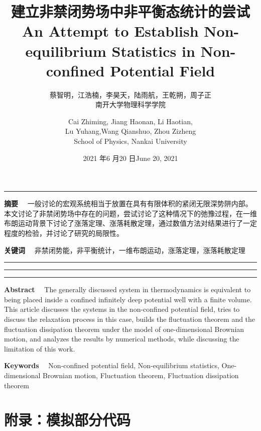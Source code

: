\documentclass[a4paper,12pt]{ctexart}
\title{建立非禁闭势场中非平衡态统计的尝试}
\author{蔡智明，江浩楠，李昊天，陆雨航，王乾朔，周子正\\南开大学物理科学学院}
\date{2021 年6 月20 日}
\begin{document}
    \maketitle
    \noindent\rule{\textwidth}{0.5pt}

    {\heiti \noindent \textbf{摘要}\ \ } 
    {\kaishu 一般讨论的宏观系统相当于放置在具有有限体积的紧闭无限深势阱内部。本文讨论了非禁闭势场中存在的问题，尝试讨论了这种情况下的弛豫过程，在一维布朗运动背景下讨论了涨落定理、涨落耗散定理，通过数值方法对结果进行了一定程度的检验，并讨论了研究的局限性。}

    {\heiti \noindent \textbf{关键词}\ \ } {\kaishu \small 非禁闭势能，非平衡统计，一维布朗运动，涨落定理，涨落耗散定理}

    \noindent\rule{\textwidth}{0.5pt}
    \tableofcontents
    \noindent\rule{\textwidth}{0.5pt}



 
     
    
    
    
    
    
    
    
    
    

    \newpage

    \title{An Attempt to Establish Non-equilibrium Statistics in Non-confined Potential Field}
    \author{Cai Zhiming, Jiang Haonan, Li Haotian, \\Lu Yuhang,Wang Qianshuo, Zhou Zizheng\\School of Physics, Nankai University}
    \date{June 20, 2021}

    \maketitle

    \noindent\rule{\textwidth}{0.5pt}

    {\heiti \noindent \textbf{Abstract}\ \ } 
    {\kaishu The generally discussed system in thermodynamics is equivalent to being placed inside a confined infinitely deep potential well with a finite volume. This article discusses the systems in the non-confined potential field, tries to discuss the relaxation process in this case, builds the fluctuation theorem and the fluctuation dissipation theorem under the model of one-dimensional Brownian motion, and analyzes the results by numerical methods, while discussing the limitation of this work.}

    {\heiti \noindent \textbf{Keywords}\ \ } {\kaishu 
    Non-confined potential field, Non-equilibrium statistics, One-dimensional Brownian motion, Fluctuation theorem, Fluctuation dissipation theorem
    }

    \newpage
    \section*{附录：模拟部分代码}
    
\end{document}
